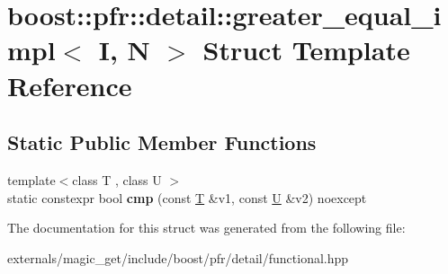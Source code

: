\hypertarget{structboost_1_1pfr_1_1detail_1_1greater__equal__impl}{}\section{boost\+:\+:pfr\+:\+:detail\+:\+:greater\+\_\+equal\+\_\+impl$<$ I, N $>$ Struct Template Reference}
\label{structboost_1_1pfr_1_1detail_1_1greater__equal__impl}
\subsection*{Static Public Member Functions}
\begin{DoxyCompactItemize}
\item 
\mbox{\label{structboost_1_1pfr_1_1detail_1_1greater__equal__impl_aa944a897c905caff8777febf7c42d8ac}} 
{\footnotesize template$<$class T , class U $>$ }\\static constexpr bool {\bfseries cmp} (const \mbox{\hyperlink{struct_t}{T}} \&v1, const \mbox{\hyperlink{union_u}{U}} \&v2) noexcept
\end{DoxyCompactItemize}


The documentation for this struct was generated from the following file\+:\begin{DoxyCompactItemize}
\item 
externals/magic\+\_\+get/include/boost/pfr/detail/functional.\+hpp\end{DoxyCompactItemize}
